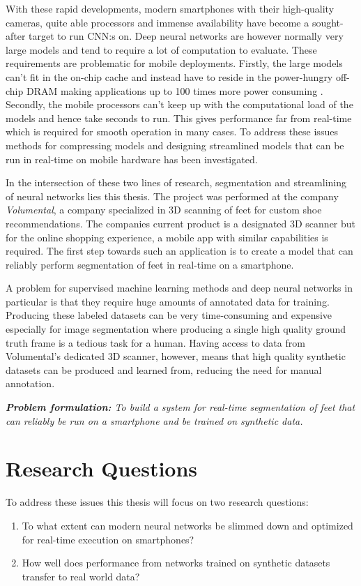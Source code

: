 \documentclass{kththesis}
\begin{document}
With these rapid developments, modern smartphones with their high-quality
cameras, quite able processors and immense availability have become a sought-after target to run CNN:s on. Deep neural networks are however normally very
large models and tend to require a lot of computation to evaluate. These
requirements are problematic for mobile deployments. Firstly, the large
models can't fit in the on-chip cache and instead have to reside in the power-hungry off-chip DRAM making applications up to 100 times more power consuming
\parencite{han2015learning}. Secondly, the mobile processors can't keep up with
the computational load of the models and hence take seconds to run. This gives
performance far from real-time which is required for smooth operation in many
cases. To address these issues methods for compressing models and designing
streamlined models that can be run in real-time on mobile hardware has been
investigated.

In the intersection of these two lines of research, segmentation and
streamlining of neural networks lies this thesis. The project was performed at
the company \textit{Volumental}, a company specialized in 3D scanning of feet
for custom shoe recommendations. The companies current product is a designated
3D scanner but for the online shopping experience, a mobile app with similar
capabilities is required. The first step towards such an application is to create
a model that can reliably perform segmentation of feet in real-time on a
smartphone.

A problem for supervised machine learning methods and deep neural networks in
particular is that they require huge amounts of annotated data for training.
Producing these labeled datasets can be very time-consuming and expensive
especially for image segmentation where producing a single high quality
ground truth frame is a tedious task for a human. Having access to data from
Volumental's dedicated 3D scanner, however, means that high quality synthetic
datasets can be produced and learned from, reducing the need for manual annotation.

\textit{\textbf{Problem formulation:} To build a system for real-time segmentation of feet that can reliably be run on a
  smartphone and be trained on synthetic data.}
\section{Research Questions}
To address these issues this thesis will focus on two research questions:
\begin{enumerate}
\item To what extent can modern neural networks be slimmed down and optimized for
  real-time execution on smartphones?
\item How well does performance from networks trained on synthetic datasets
  transfer to real world data? 
\end{enumerate}
\end{document}
